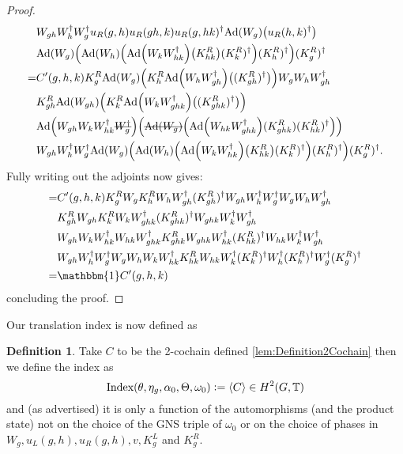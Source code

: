 \documentclass[12pt,a4paper,twoside]{article}
\newcommand{\stkout}[1]{\ifmmode\text{\sout{\ensuremath{#1}}}\else\sout{#1}\fi}
\newcommand{\defeq}{\vcentcolon=}
\let\originalleft\left
\let\originalright\right
\renewcommand{\left}{\mathopen{}\mathclose\bgroup\originalleft}
\renewcommand{\right}{\aftergroup\egroup\originalright}
\newcommand{\TT}{\mathbb T}
\newcommand{\Ad}[1]{\textrm{Ad}\left(#1\right)}
\theoremstyle{definition}
\newtheorem{definition}[theorem]{Definition}
\numberwithin{equation}{section}
\begin{document}
\begin{proof}
\begin{align}
		\nonumber
		&W_{gh}W_h^\dagger W_g^\dagger u_R(g,h) u_R(gh,k)u_R(g,hk)^\dagger\Ad{W_g}\left(u_R(h,k)^\dagger\right)\\
		\nonumber
		&\Ad{W_g}\left(\Ad{W_h}\left(\Ad{W_kW_{hk}^\dagger}\left(K_{hk}^R\right)(K^R_k)^\dagger\right)(K^R_h)^\dagger\right)(K^R_g)^\dagger\\
		=&C'(g,h,k)K_g^R\Ad{W_g}\left(K_h^R\Ad{W_hW_{gh}^\dagger}\left((K_{gh}^R)^\dagger\right)\right)W_gW_hW_{gh}^\dagger \\
		\nonumber
		&K_{gh}^R\Ad{W_{gh}}\left(K_k^R\Ad{W_kW_{ghk}^\dagger}\left((K_{ghk}^R)^\dagger\right)\right)\\
		\nonumber
		&\Ad{W_{gh}W_kW_{hk}^\dagger \stkout{W_{g}^\dagger}}  \left(\stkout{\Ad{W_g}}\left( \Ad{W_{hk}W_{ghk}^\dagger}(K^R_{ghk})(K^R_{hk})^{\dagger} \right)\right)\\
		\nonumber
		&W_{gh}W_h^\dagger W_g^\dagger\Ad{W_g}\left(\Ad{W_h}\left(\Ad{W_kW_{hk}^\dagger}\left(K_{hk}^R\right)(K^R_k)^\dagger\right)(K^R_h)^\dagger\right)(K^R_g)^\dagger.
	\end{align}
	Fully writing out the adjoints now gives:
	\begin{align}
	=&C'(g,h,k)K_g^RW_gK_h^RW_hW_{gh}^\dagger (K_{gh}^R)^\dagger W_{gh}W_h^\dagger W_g^\dagger W_gW_hW_{gh}^\dagger \\
	\nonumber
	&K_{gh}^RW_{gh}K_k^RW_kW_{ghk}^\dagger(K_{ghk}^R)^\dagger W_{ghk}W_k^\dagger W_{gh}^\dagger  \\
	\nonumber
	&W_{gh}W_kW_{hk}^\dagger W_{hk}W_{ghk}^\dagger K^R_{ghk} W_{ghk}W_{hk}^\dagger(K^R_{hk})^{\dagger} W_{hk}W_k^\dagger W_{gh}^\dagger\\
	\nonumber
	&W_{gh}W_h^\dagger W_g^\dagger W_gW_h W_kW_{hk}^\dagger K_{hk}^RW_{hk}W_k^\dagger(K^R_k)^\dagger W_h^\dagger (K^R_h)^\dagger W_g^\dagger (K^R_g)^\dagger\\
	=&\mathbbm{1}C'(g,h,k)
	\end{align}
	concluding the proof.
\end{proof}
Our translation index is now defined as
\begin{definition}
	Take $C$ to be the 2-cochain defined \ref{lem:Definition2Cochain} then we define the index as
	\begin{equation}
	\textrm{Index}(\theta,\eta_g,\alpha_0,\Theta,\omega_0)\defeq\expval{C}\in H^2(G,\TT)
	\end{equation}
	and (as advertised) it is only a function of the automorphisms (and the product state) not on the choice of the GNS triple of $\omega_0$ or on the choice of phases in $W_g,u_L(g,h),u_R(g,h),v,K_g^L$ and $K_g^R$.
\end{definition}
\end{document}

